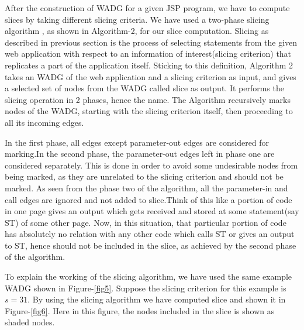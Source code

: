 \documentclass[11pt]{article}   %
\begin{document}
After the construction of WADG for a given JSP program, we have to compute slices by taking different slicing criteria. We have used a two-phase slicing algorithm \cite{horwitz1990interprocedural}, as shown in Algorithm-2, for our slice computation.  Slicing as described in previous section is the process of selecting statements from the given web application with respect to an information of interest(slicing criterion) that replicates a part of the application itself. Sticking to this definition, Algorithm 2 takes an WADG of the web application and a slicing criterion as input, and gives a selected set of nodes from the WADG called slice as output. It performs the slicing operation in 2 phases, hence the name. The Algorithm recursively marks nodes of the WADG, starting with the slicing criterion itself, then proceeding to all its incoming edges. 

In the first phase, all edges except parameter-out edges are considered for marking.In the second phase, the parameter-out edges left in phase one are considered separately. This is done in order to avoid some undesirable nodes from being marked, as they are unrelated to the slicing criterion and should not be marked. As seen from the phase two of the algorithm, all the parameter-in and call edges are ignored and not added to slice.Think of this like a portion of code in one page gives an output which gets received and stored at some statement(say ST) of some other page. Now, in this situation, that particular portion of code has absolutely no relation with any other code which calls ST or gives an output to ST, hence should not be included in the slice, as achieved by the second phase of the algorithm.

To explain the working of the slicing algorithm, we have used the same example WADG shown in Figure-\ref{fig5}. Suppose the slicing criterion for this example is $s=31$. By using the slicing algorithm we have computed slice and shown it in Figure-\ref{fig6}. Here in this figure, the nodes included in the slice is shown as shaded nodes.
\end{document}

